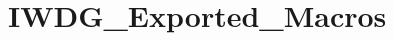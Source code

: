 \hypertarget{group___i_w_d_g___exported___macros}{}\section{I\+W\+D\+G\+\_\+\+Exported\+\_\+\+Macros}
\label{group___i_w_d_g___exported___macros}
